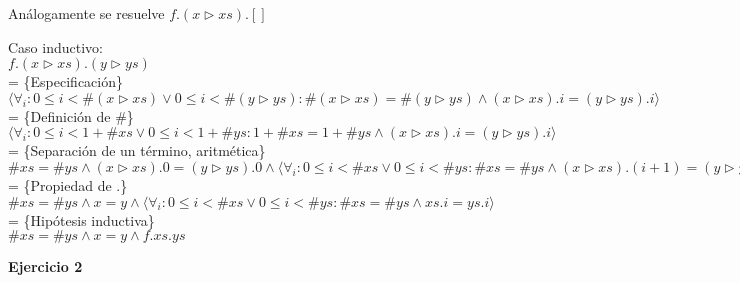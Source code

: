 \documentclass[12pt]{article}
\begin{document}
\begin{itemize}
    \bigbreak

    Análogamente se resuelve $ f.(x \triangleright xs).[] $

    \bigbreak

    Caso inductivo:\\
    $ f.(x \triangleright xs).(y \triangleright ys) $\\
    = \{Especificación\}\\
    $ \langle \forall_i : 0 \le i < \#(x \triangleright xs) \lor 0 \le i < \#(y \triangleright ys) : \#(x \triangleright xs) = \#(y \triangleright ys) \land (x \triangleright xs).i = (y \triangleright ys).i \rangle $\\
    = \{Definición de \#\}\\
    $ \langle \forall_i : 0 \le i < 1 + \#xs \lor 0 \le i < 1 + \#ys : 1 + \#xs = 1 + \#ys \land (x \triangleright xs).i = (y \triangleright ys).i \rangle $\\
    = \{Separación de un término, aritmética\}\\
    $ \#xs = \#ys \land (x \triangleright xs).0 = (y \triangleright ys).0 \land \langle \forall_i : 0 \le i < \#xs \lor 0 \le i < \#ys : \#xs = \#ys \land (x \triangleright xs).(i + 1) = (y \triangleright ys).(i + 1) \rangle $\\
    = \{Propiedad de .\}\\
    $ \#xs = \#ys \land x = y \land \langle \forall_i : 0 \le i < \#xs \lor 0 \le i < \#ys : \#xs = \#ys \land xs.i = ys.i \rangle $\\
    = \{Hipótesis inductiva\}\\
    $ \#xs = \#ys \land x = y \land f.xs.ys $\\

\end{itemize}

\bigbreak

\textbf{Ejercicio 2}
\end{document}
